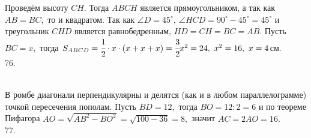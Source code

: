\documentclass[12pt]{article}
\begin{document}
Проведём высоту $CH.$ Тогда $ABCH$ является прямоугольником, а так как $AB=BC,$ то и квадратом. Так как $\angle D=45^\circ,\ \angle HCD=90^\circ-45^\circ=45^\circ$ и треугольник $CHD$ является равнобедренным, $HD=CH=BC=AB.$ Пусть $BC=x,$ тогда $S_{ABCD}=\cfrac{1}{2}\cdot{x}\cdot(x+x+x)=\cfrac{3}{2}x^2=24,\ x^2=16,\ x=4$см.\\
76. \begin{figure}[ht!]
\end{figure}\\
В ромбе диагонали перпендикулярны и делятся (как и в любом параллелограмме) точкой пересечения пополам. Пусть $BD=12,$ тогда $BO=12:2=6$ и по теореме Пифагора $AO=\sqrt{AB^2-BO^2}=\sqrt{100-36}=8,$ значит $AC=2AO=16.$\\
77. \begin{figure}[ht!]
\end{figure}\\
\end{document}
